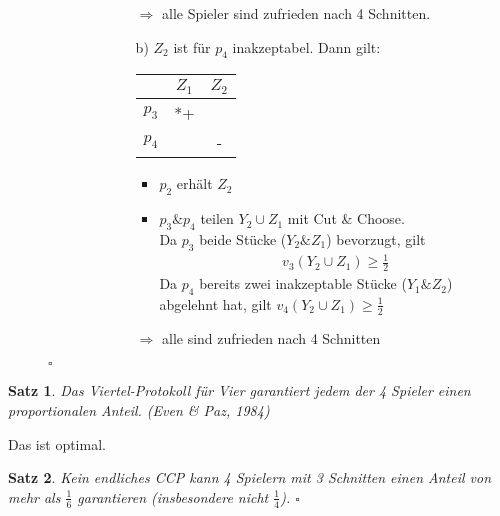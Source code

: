 \documentclass[a4paper,10pt]{scrartcl}
\newtheorem*{satz*}{Satz}
\begin{document}
\begin{description}
\begin{itemize}
\begin{description}
\begin{enumerate}
\begin{itemize}
                                               \end{itemize}
                                               $\Rightarrow$ alle Spieler sind zufrieden nach 4 Schnitten.
                                         \item[b)] $Z_2$ ist für $p_4$ inakzeptabel. Dann gilt:\\
                                                  \begin{tabular}{c|cc}
                                                   &$Z_1$&$Z_2$\\\hline
                                                   $p_3$&*+&\\
                                                   $p_4$&&-
                                                  \end{tabular}
                                                  \begin{itemize}
                                                   \item $p_2$ erhält $Z_2$
                                                   \item $p_3\&p_4$ teilen $Y_2\cup Z_1$ mit Cut \& Choose.\\
                                                         Da $p_3$ beide Stücke ($Y_2\&Z_1$) bevorzugt, gilt
                                                         \begin{eqnarray*}
                                                          v_3(Y_2\cup Z_1)\geq\frac{1}{2}
                                                         \end{eqnarray*}
                                                         Da $p_4$ bereits zwei inakzeptable Stücke ($Y_1\&Z_2$) abgelehnt hat, gilt $v_4(Y_2\cup
                                                         Z_1)\geq\frac{1}{2}$
                                                  \end{itemize}
                                                  $\Rightarrow$ alle sind zufrieden nach 4 Schnitten
                                        \end{enumerate} 
                       \end{description}
                \end{itemize}$\square$
 \end{description} 
\begin{satz*}
 Das Viertel-Protokoll für Vier garantiert jedem der 4 Spieler einen proportionalen Anteil. (Even \& Paz, 1984)
\end{satz*}
Das ist optimal.
\begin{satz*}
 Kein endliches CCP kann 4 Spielern mit 3 Schnitten einen Anteil von mehr als $\frac{1}{6}$ garantieren (insbesondere nicht $\frac{1}{4}$).
 $\square$
\end{satz*}
\end{document}
